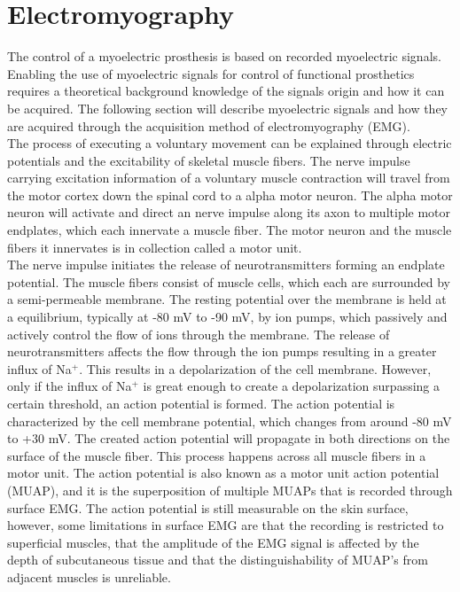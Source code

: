 \section{Electromyography}

The control of a myoelectric prosthesis is based on recorded myoelectric signals. \cite{Geethanjali2016}  Enabling the use of myoelectric signals for control of functional prosthetics requires a theoretical background knowledge of the signals origin and how it can be acquired. The following section will describe myoelectric signals and how they are acquired through the acquisition method of electromyography (EMG).   \\
The process of executing a voluntary movement can be explained through electric potentials and the excitability of skeletal muscle fibers. The nerve impulse carrying excitation information of a voluntary muscle contraction will travel from the motor cortex down the spinal cord to a alpha motor neuron. The alpha motor neuron will activate and direct an nerve impulse along its axon to multiple motor endplates, which each innervate a muscle fiber. The motor neuron and the muscle fibers it innervates is in collection called a motor unit. \cite{Turker2013} \\
The nerve impulse initiates the release of neurotransmitters forming an endplate potential. The muscle fibers consist of muscle cells, which each are surrounded by a semi-permeable membrane. The resting potential over the membrane is held at a equilibrium, typically at -80 mV to -90 mV, by ion pumps, which passively and actively control the flow of ions through the membrane. The release of neurotransmitters affects the flow through the ion pumps resulting in a greater influx of Na$^+$. This results in a depolarization of the cell membrane. However, only if the influx of Na$^+$ is great enough to create a depolarization surpassing a certain threshold, an action potential is formed. The action potential is characterized by the cell membrane potential, which changes from around -80 mV to +30 mV. %
The created action potential will propagate in both directions on the surface of the muscle fiber. This process happens across all muscle fibers in a motor unit. The action potential is also known as a motor unit action potential (MUAP), and it is the superposition of multiple MUAPs that is recorded through surface EMG. The action potential is still measurable on the skin surface, however, some limitations in surface EMG are that the recording is restricted to superficial muscles, that the amplitude of the EMG signal is affected by the depth of subcutaneous tissue and that the distinguishability of MUAP's from adjacent muscles is unreliable. \cite{Turker2013,Martini2012} \\
